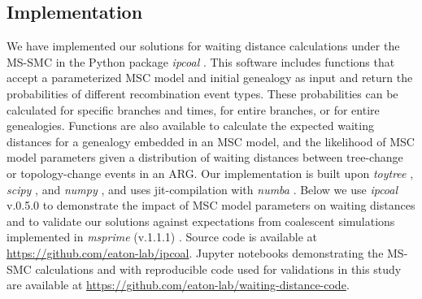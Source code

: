 \documentclass[11pt]{article}
\begin{document}
\subsection{Implementation}
We have implemented our solutions for waiting distance calculations
under the MS-SMC in the Python package \emph{ipcoal} \citep{mckenzie_ipcoal_2020}.
This software includes functions that accept a parameterized MSC model and 
initial genealogy as input and return the probabilities of different 
recombination event types. These probabilities can be calculated for specific 
branches and times, for entire branches, or for entire genealogies. 
Functions are also available to calculate the expected waiting distances 
for a genealogy embedded in an MSC model,
and the likelihood of MSC model parameters given a distribution 
of waiting distances between tree-change or topology-change events in an ARG.
Our implementation is built upon \emph{toytree} \citep{eaton_toytree_2020}, 
\emph{scipy} \citep{2020SciPy-NMeth}, and 
\emph{numpy} \citep{harris2020array}, and 
uses jit-compilation with \emph{numba} 
\citep{lam2015numba}.
Below we use \emph{ipcoal} v.0.5.0 to demonstrate the impact of 
MSC model parameters on waiting distances and to validate our solutions against 
expectations from coalescent simulations implemented in 
\emph{msprime} (v.1.1.1) \citep{baumdicker_efficient_2022}.
Source code is available at \url{https://github.com/eaton-lab/ipcoal}.
Jupyter notebooks demonstrating the MS-SMC calculations and with 
reproducible code used for validations in this study are available
at \url{https://github.com/eaton-lab/waiting-distance-code}.
\end{document}
